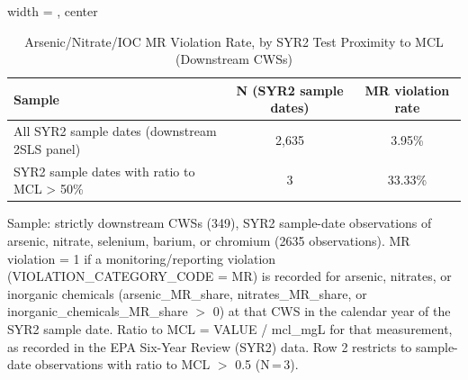 \begin{table}[htbp]
\caption{\label{tab:sanitary_visit_syr2_test_mcl_rate} Arsenic/Nitrate/IOC MR Violation Rate, by SYR2 Test Proximity to MCL (Downstream CWSs)}
\bigskip
\centering
\begin{adjustbox}{width = \textwidth, center}
\begin{tabular}{lcc}
\toprule
Sample & N (SYR2 sample dates) & MR violation rate \\
\midrule
All SYR2 sample dates (downstream 2SLS panel) & 2{,}635 & 3.95\% \\
SYR2 sample dates with ratio to MCL > 50\% & 3 & 33.33\% \\
\bottomrule
\end{tabular}
\end{adjustbox}
{\tiny\linespread{1}\selectfont \par \raggedright 
Sample: strictly downstream CWSs (349), SYR2 sample-date observations of arsenic, nitrate, selenium, barium, or chromium (2635 observations). MR violation = 1 if a monitoring/reporting violation (VIOLATION\_CATEGORY\_CODE = MR) is recorded for arsenic, nitrates, or inorganic chemicals (arsenic\_MR\_share, nitrates\_MR\_share, or inorganic\_chemicals\_MR\_share $>$ 0) at that CWS in the calendar year of the SYR2 sample date. Ratio to MCL = VALUE / mcl\_mgL for that measurement, as recorded in the EPA Six-Year Review (SYR2) data. Row 2 restricts to sample-date observations with ratio to MCL $>$ 0.5 (N\,=\,3).
}
\end{table}
